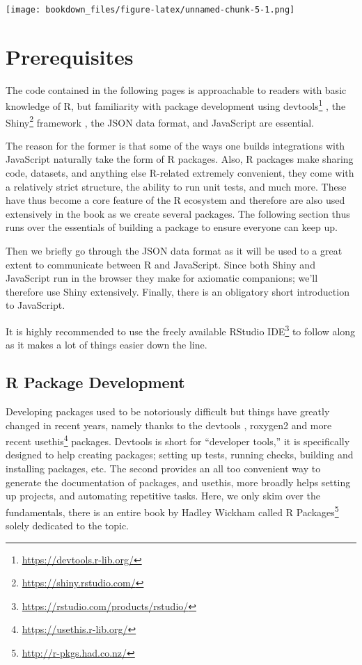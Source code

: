 \documentclass[
]{krantz}
\renewcommand{\href}[2]{#2\footnote{\url{#1}}}
\begin{document}
\texttt{[image: bookdown\_files/figure-latex/unnamed-chunk-5-1.png]}

\hypertarget{prerequisites}{%
\chapter{Prerequisites}\label{prerequisites}}

The code contained in the following pages is approachable to readers with basic knowledge of R, but familiarity with package development using \href{https://devtools.r-lib.org/}{devtools} \citep{R-devtools}, the \href{https://shiny.rstudio.com/}{Shiny} framework \citep{R-shiny}, the JSON data format, and JavaScript are essential.

The reason for the former is that some of the ways one builds integrations with JavaScript naturally take the form of R packages. Also, R packages make sharing code, datasets, and anything else R-related extremely convenient, they come with a relatively strict structure, the ability to run unit tests, and much more. These have thus become a core feature of the R ecosystem and therefore are also used extensively in the book as we create several packages. The following section thus runs over the essentials of building a package to ensure everyone can keep up.

Then we briefly go through the JSON data format as it will be used to a great extent to communicate between R and JavaScript. Since both Shiny and JavaScript run in the browser they make for axiomatic companions; we'll therefore use Shiny extensively. Finally, there is an obligatory short introduction to JavaScript.

It is highly recommended to use the freely available \href{https://rstudio.com/products/rstudio/}{RStudio IDE} to follow along as it makes a lot of things easier down the line.

\hypertarget{basics-pacakge-dev}{%
\section{R Package Development}\label{basics-pacakge-dev}}

Developing packages used to be notoriously difficult but things have greatly changed in recent years, namely thanks to the devtools \citep{R-devtools}, roxygen2 \citep{R-roxygen2} and more recent \href{https://usethis.r-lib.org/}{usethis} \citep{R-usethis} packages. Devtools is short for ``developer tools,'' it is specifically designed to help creating packages; setting up tests, running checks, building and installing packages, etc. The second provides an all too convenient way to generate the documentation of packages, and usethis, more broadly helps setting up projects, and automating repetitive tasks. Here, we only skim over the fundamentals, there is an entire book by Hadley Wickham called \href{http://r-pkgs.had.co.nz/}{R Packages} solely dedicated to the topic.
\end{document}
